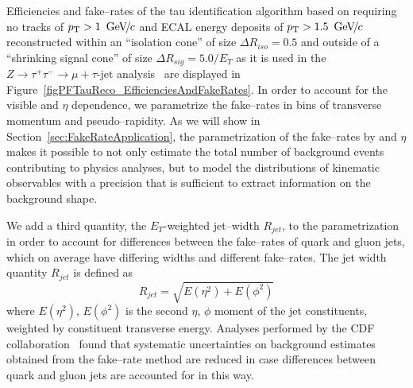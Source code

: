Efficiencies and fake--rates of the tau identification algorithm based on
requiring no tracks of $p_{\mathrm{T}} > 1~{\,\text{Ge\hspace{-.08em}V\hspace{-0.16em}/\hspace{-0.08em}}c}$ and ECAL energy deposits of $p_{\mathrm{T}} >
1.5~{\,\text{Ge\hspace{-.08em}V\hspace{-0.16em}/\hspace{-0.08em}}c}$ reconstructed within an ``isolation cone'' of size $\Delta R_{iso} =
0.5$ and outside of a ``shrinking signal cone'' of size $\Delta R_{sig} = 5.0 /
E_{T}$ as it is used in the $Z \rightarrow \tau^{+} \tau^{-} \rightarrow \mu +
\tau\mbox{-jet}$ analysis~\cite{CMS-PAS-EWK-10-002} are displayed in
Figure~\ref{figPFTauReco_EfficienciesAndFakeRates}.  In order to account for the
visible \pt and $\eta$ dependence, we parametrize the fake--rates in bins of
transverse momentum and pseudo--rapidity.  As we will show in
Section~\ref{sec:FakeRateApplication}, the parametrization of the fake--rates by
\pt and $\eta$ makes it possible to not only estimate the total number of
background events contributing to physics analyses, but to model the
distributions of kinematic observables with a precision that is sufficient to
extract information on the background shape.

We add a third quantity, the $E_{T}$-weighted jet--width $R_{jet}$, to the
parametrization in order to account for differences between the fake--rates of
quark and gluon jets, which on average have differing widths and different
fake--rates.  The jet
width quantity $R_{jet}$ is defined as 
\begin{equation}
R_{jet} = \sqrt{E \left( \eta^2 \right) + E \left( \phi^2 \right)}
\nonumber
\end{equation}
where $E \left( \eta^2 \right)$, $E \left( \phi^2 \right)$ is the second $\eta$,
$\phi$ moment of the jet constituents, weighted by constituent transverse
energy. Analyses performed by the CDF collaboration~\cite{CDFMSSMHiggs,
CDFFakerateDJang, CDFrefPzeta} found that systematic uncertainties on
background estimates obtained from the fake--rate method are reduced in case
differences between quark and gluon jets are accounted for in this way.

